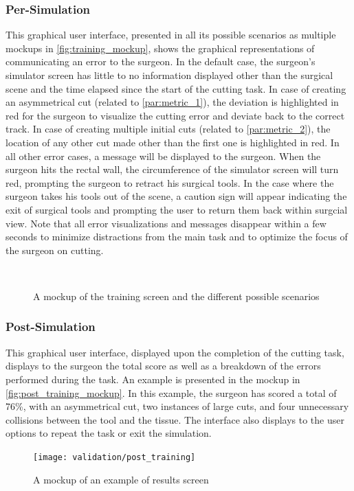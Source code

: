 \subsubsection{Per-Simulation}
This graphical user interface, presented in all its possible scenarios as multiple mockups in \autoref{fig:training_mockup}, shows the graphical representations of communicating an error to the surgeon. In the default case, the surgeon's simulator screen has little to no information displayed other than the surgical scene and the time elapsed since the start of the cutting task. In case of creating an asymmetrical cut (related to \autoref{par:metric_1}), the deviation is highlighted in red for the surgeon to visualize the cutting error and deviate back to the correct track. In case of creating multiple initial cuts (related to \autoref{par:metric_2}), the location of any other cut made other than the first one is highlighted in red. In all other error cases, a message will be displayed to the surgeon.
When the surgeon hits the rectal wall, the circumference of the simulator screen will turn red, prompting the surgeon to retract his surgical tools. In the case where the surgeon takes his tools out of the scene, a caution sign will appear indicating the exit of surgical tools and prompting the user to return them back within surgcial view.
Note that all error visualizations and messages disappear within a few seconds to minimize distractions from the main task and to optimize the focus of the surgeon on cutting.
\begin{figure}
  \centering%
  \hfill%
  \\
  \hfill%
  \caption{A mockup of the training screen and the different possible scenarios}\label{fig:training_mockup}
\end{figure}

\subsubsection{Post-Simulation}
This graphical user interface, displayed upon the completion of the cutting task, displays to the surgeon the total score as well as a breakdown of the errors performed during the task. An example is presented in the mockup in \autoref{fig:post_training_mockup}. In this example, the surgeon has scored a total of 76\%, with an asymmetrical cut, two instances of large cuts, and four unnecessary collisions between the tool and the tissue. The interface also displays to the user options to repeat the task or exit the simulation.
\begin{figure}
  \centering%
  \texttt{[image: validation/post\_training]}
  \caption{A mockup of an example of results screen}\label{fig:post_training_mockup}
\end{figure}

